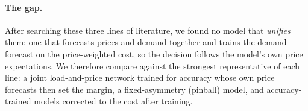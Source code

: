 \paragraph*{The gap.}  After searching these three lines of literature, we found no
model that \emph{unifies} them: one that forecasts prices and demand together
and trains the demand forecast on the price-weighted cost, so the
decision follows the model's own price expectations.  We therefore
compare against the strongest representative of each line: a joint
load-and-price network trained for accuracy whose own price forecasts then set
the margin, a fixed-asymmetry (pinball) model, and accuracy-trained models
corrected to the cost after training.
